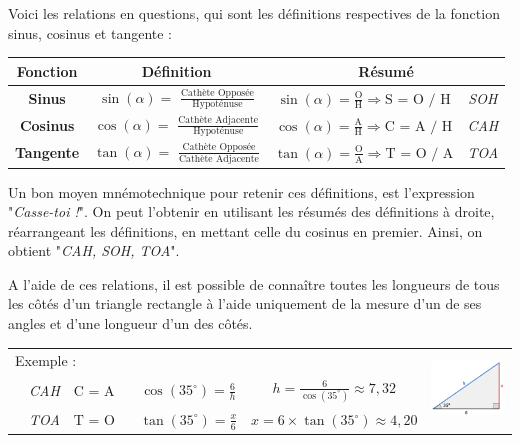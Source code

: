 \documentclass[a4paper]{article}
\begin{document}
\newpage

			Voici les relations en questions, qui sont les définitions respectives de la fonction sinus, cosinus et tangente :
			
			\begin{center}
				
				\renewcommand{\arraystretch}{2}
				\begin{tabular}{|c|ccc|}
					\hline
					\textbf{Fonction} & \textbf{Définition}                                                                 & \multicolumn{2}{c|}{\textbf{Résumé}} \\
					\hline
					\textbf{Sinus}    & $\sin(\alpha) =$ {\Large $\frac{\text{Cathète Opposée}}{\text{Hypoténuse}}$       } & $\sin(\alpha) = \frac{\text{O}}{\text{H}} \Longrightarrow \text{S = O / H} $ & \textit{SOH} \\
					\textbf{Cosinus}  & $\cos(\alpha) =$ {\Large $\frac{\text{Cathète Adjacente}}{\text{Hypoténuse}}$     } & $\cos(\alpha) = \frac{\text{A}}{\text{H}} \Longrightarrow \text{C = A / H} $ & \textit{CAH} \\
					\textbf{Tangente} & $\tan(\alpha) =$ {\Large $\frac{\text{Cathète Opposée}}{\text{Cathète Adjacente}}$} & $\tan(\alpha) = \frac{\text{O}}{\text{A}} \Longrightarrow \text{T = O / A} $ & \textit{TOA} \\
					\hline
				\end{tabular}
			\end{center}

			Un bon moyen mnémotechnique pour retenir ces définitions, 
			est l'expression "\textit{Casse-toi !}". 
			On peut l'obtenir en utilisant les résumés des définitions à droite, 
			réarrangeant les définitions, en mettant celle du cosinus en premier.
			Ainsi, on obtient "\textit{CAH, SOH, TOA}".
			
			\medbreak

			A l'aide de ces relations, 
			il est possible de connaître toutes les longueurs de 
			tous les côtés d'un triangle rectangle à l'aide uniquement 
			de la mesure d'un de ses angles et d'une longueur d'un des côtés.

			
			
			\begin{center}
				\renewcommand{\arraystretch}{1.75}
				\begin{tabular}{lc|c|c|cc}
					\multicolumn{5}{l}{Exemple :} & \multirow{3}{*}{\includegraphics[height=2cm]{Image/Triangle/Triangle_sinus_cosinus.png}} \\
					
					\phantom{Exemple} & \textit{CAH} & $\text{C = A / H}$ & $\cos(35^\circ) = \frac{6}{h}$ & $h = \frac{6}{\cos(35^\circ)} \approx 7,32 $ & \\
										& \textit{TOA} & $\text{T = O / A}$ & $\tan(35^\circ) = \frac{x}{6}$ & $x = 6 \times \tan(35^\circ) \approx 4,20 $ &\\
				\end{tabular}
			\end{center}
			
\end{document}
